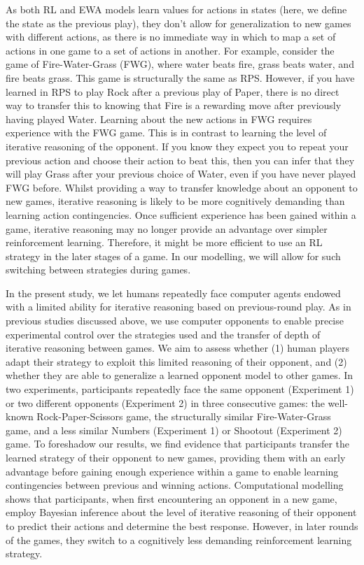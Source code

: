 \documentclass[smallextended]{svjour3}       %
\begin{document}
As both RL and EWA models learn values for actions in states (here, we
define the state as the previous play), they don't allow for
generalization to new games with different actions, as there is no
immediate way in which to map a set of actions in one game to a set of
actions in another. For example, consider the game of Fire-Water-Grass
(FWG), where water beats fire, grass beats water, and fire beats grass.
This game is structurally the same as RPS. However, if you have learned
in RPS to play Rock after a previous play of Paper, there is no direct
way to transfer this to knowing that Fire is a rewarding move after
previously having played Water. Learning about the new actions in FWG
requires experience with the FWG game. This is in contrast to learning
the level of iterative reasoning of the opponent. If you know they
expect you to repeat your previous action and choose their action to
beat this, then you can infer that they will play Grass after your
previous choice of Water, even if you have never played FWG before.
Whilst providing a way to transfer knowledge about an opponent to new
games, iterative reasoning is likely to be more cognitively demanding
than learning action contingencies. Once sufficient experience has been
gained within a game, iterative reasoning may no longer provide an
advantage over simpler reinforcement learning. Therefore, it might be
more efficient to use an RL strategy in the later stages of a game. In
our modelling, we will allow for such switching between strategies
during games.

In the present study, we let humans repeatedly face computer agents
endowed with a limited ability for iterative reasoning based on
previous-round play. As in previous studies discussed above, we use
computer opponents to enable precise experimental control over the
strategies used and the transfer of depth of iterative reasoning between
games. We aim to assess whether (1) human players adapt their strategy
to exploit this limited reasoning of their opponent, and (2) whether
they are able to generalize a learned opponent model to other games. In
two experiments, participants repeatedly face the same opponent
(Experiment 1) or two different opponents (Experiment 2) in three
consecutive games: the well-known Rock-Paper-Scissors game, the
structurally similar Fire-Water-Grass game, and a less similar Numbers
(Experiment 1) or Shootout (Experiment 2) game. To foreshadow our
results, we find evidence that participants transfer the learned
strategy of their opponent to new games, providing them with an early
advantage before gaining enough experience within a game to enable
learning contingencies between previous and winning actions.
Computational modelling shows that participants, when first encountering
an opponent in a new game, employ Bayesian inference about the level of
iterative reasoning of their opponent to predict their actions and
determine the best response. However, in later rounds of the games, they
switch to a cognitively less demanding reinforcement learning strategy.
\end{document}
